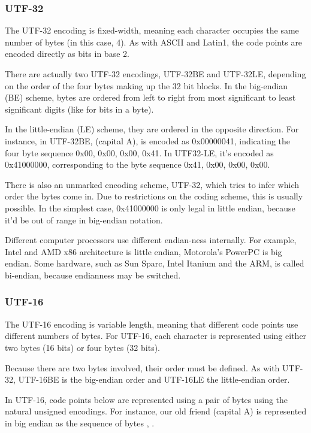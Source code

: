 \subsubsection{UTF-32}

The UTF-32 encoding is fixed-width, meaning each character occupies
the same number of bytes (in this case, 4).  As with ASCII and
Latin1, the code points are encoded directly as bits in base 2.

There are actually two UTF-32 encodings, UTF-32BE and UTF-32LE,
depending on the order of the four bytes making up the 32 bit blocks.
In the big-endian (BE) scheme, bytes are ordered from left to right
from most significant to least significant digits (like for bits in a
byte).  

In the little-endian (LE) scheme, they are ordered in the
opposite direction.  For instance, in UTF-32BE, 
(capital A), is encoded as 0x00000041, indicating the four byte
sequence 0x00, 0x00, 0x00, 0x41.  In UTF32-LE, it's encoded as
0x41000000, corresponding to the byte sequence 0x41, 0x00, 0x00, 0x00.

There is also an unmarked encoding scheme, UTF-32, which tries to
infer which order the bytes come in.  Due to restrictions on the
coding scheme, this is usually possible.  In the simplest case,
0x41000000 is only legal in little endian, because it'd be out of
range in big-endian notation.  

Different computer processors use different endian-ness
internally.  For example, Intel and AMD x86 architecture is little
endian, Motorola's PowerPC is big endian.  Some hardware, such
as Sun Sparc, Intel Itanium and the ARM, is called bi-endian, because
endianness may be switched.

\subsubsection{UTF-16}\label{section:utf-16}

The UTF-16 encoding is variable length, meaning that different code
points use different numbers of bytes.  For UTF-16, each character is
represented using either two bytes (16 bits) or four bytes (32 bits).

Because there are two bytes involved, their order must be defined.  As
with UTF-32, UTF-16BE is the big-endian order and UTF-16LE the
little-endian order.

In UTF-16, code points below  are represented using a
pair of bytes using the natural unsigned encodings.  For instance, our
old friend  (capital A) is represented in big endian as
the sequence of bytes , .

